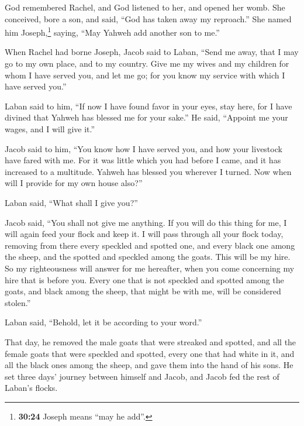  God remembered Rachel, and God listened to her, and
opened her womb.  She conceived, bore a son, and said,
``God has taken away my reproach.''  She named him
Joseph,\footnote{\textbf{30:24} Joseph means ``may he add''.} saying,
``May Yahweh add another son to me.''

 When Rachel had borne Joseph, Jacob said to Laban,
``Send me away, that I may go to my own place, and to my country.
 Give me my wives and my children for whom I have served
you, and let me go; for you know my service with which I have served
you.''

 Laban said to him, ``If now I have found favor in your
eyes, stay here, for I have divined that Yahweh has blessed me for your
sake.''  He said, ``Appoint me your wages, and I will
give it.''

 Jacob said to him, ``You know how I have served you, and
how your livestock have fared with me.  For it was little
which you had before I came, and it has increased to a multitude. Yahweh
has blessed you wherever I turned. Now when will I provide for my own
house also?''

 Laban said, ``What shall I give you?''

Jacob said, ``You shall not give me anything. If you will do this thing
for me, I will again feed your flock and keep it.  I will
pass through all your flock today, removing from there every speckled
and spotted one, and every black one among the sheep, and the spotted
and speckled among the goats. This will be my hire.  So
my righteousness will answer for me hereafter, when you come concerning
my hire that is before you. Every one that is not speckled and spotted
among the goats, and black among the sheep, that might be with me, will
be considered stolen.''

 Laban said, ``Behold, let it be according to your
word.''

 That day, he removed the male goats that were streaked
and spotted, and all the female goats that were speckled and spotted,
every one that had white in it, and all the black ones among the sheep,
and gave them into the hand of his sons.  He set three
days' journey between himself and Jacob, and Jacob fed the rest of
Laban's flocks.

